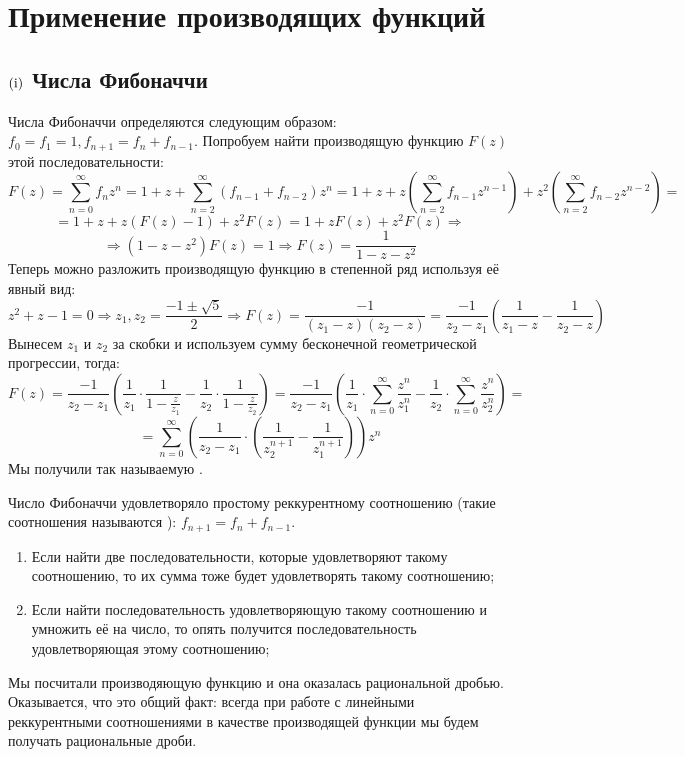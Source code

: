 \documentclass[12pt]{article}
\newcommand{\RN}[1]{%
	\textup{\uppercase\expandafter{\romannumeral#1}}%
}
\theoremstyle{definition}
\newcommand{\ddsum}[2]{\displaystyle\sum\limits_{#1}^{#2}}
\begin{document}
\newpage
\section*{Применение производящих функций}
\subsection*{$(\RN{1})$ Числа Фибоначчи}
Числа Фибоначчи определяются следующим образом: $f_0 = f_1 = 1, f_{n+1} = f_n + f_{n-1}$. Попробуем найти производящую функцию $F(z)$ этой последовательности:
$$
	F(z) = \ddsum{n = 0}{\infty}f_n z^n = 1 + z + \ddsum{n = 2}{\infty}(f_{n-1} + f_{n-2})z^n = 1 + z + z\left(\ddsum{n = 2}{\infty}f_{n -1}z^{n-1}\right) + z^2\left(\ddsum{n = 2}{\infty}f_{n-2}z^{n-2}\right) =
$$
$$
	= 1 + z + z(F(z) - 1) + z^2F(z) = 1 + z F(z) + z^2 F(z) \Rightarrow 
$$
$$	
	\Rightarrow (1 - z - z^2)F(z) = 1 \Rightarrow F(z) = \dfrac{1}{1 - z - z^2}
$$
Теперь можно разложить производящую функцию в степенной ряд используя её явный вид:
$$
	z^2 + z - 1 = 0 \Rightarrow z_1,z_2 = \dfrac{-1 \pm \sqrt{5}}{2} \Rightarrow F(z) = \dfrac{-1}{(z_1 - z)(z_2 - z)} = \dfrac{-1}{z_2 - z_1}\left(\dfrac{1}{z_1 - z} - \dfrac{1}{z_2 - z}\right)
$$
Вынесем $z_1$ и $z_2$ за скобки и используем сумму бесконечной геометрической прогрессии, тогда:
$$
	F(z) = \dfrac{-1}{z_2 - z_1}\left(\dfrac{1}{z_1}{\cdot}\dfrac{1}{1 - \frac{z}{z_1}} - \dfrac{1}{z_2}{\cdot}\dfrac{1}{1 - \frac{z}{z_2}}\right) = \dfrac{-1}{z_2 - z_1}\left(\dfrac{1}{z_1}{\cdot}\ddsum{n = 0}{\infty}\dfrac{z^n}{z_1^n} - \dfrac{1}{z_2}{\cdot}\ddsum{n = 0}{\infty}\dfrac{z^n}{z_2^n}\right) =
$$
$$
	=	\ddsum{n = 0}{\infty}\left(\dfrac{1}{z_2 - z_1}{\cdot}\left(\dfrac{1}{z_2^{n+1}} - \dfrac{1}{z_1^{n+1}}\right)\right)z^n
$$
Мы получили так называемую .

Число Фибоначчи удовлетворяло простому реккурентному соотношению (такие соотношения называются ): $f_{n+1} = f_n + f_{n-1}$. 
\begin{enumerate}[label=(\arabic*)]
	\item Если найти две последовательности, которые удовлетворяют такому соотношению, то их сумма тоже будет удовлетворять такому соотношению;
	
	\item  Если найти последовательность удовлетворяющую такому соотношению и умножить её на число, то опять получится последовательность удовлетворяющая этому соотношению;
\end{enumerate}
Мы посчитали производяющую функцию и она оказалась рациональной дробью. Оказывается, что это общий факт: всегда при работе с линейными реккурентными соотношениями в качестве производящей функции мы будем получать рациональные дроби.
\end{document}

